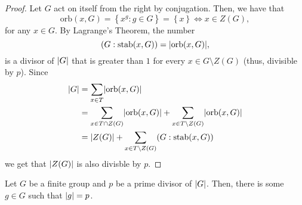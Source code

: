\begin{proof}
  Let \(G\) act on itself from the right by conjugation. Then, we have that
  \[
    \text{orb}(x,G)
    =
    \left\{x^{g}:g\in{G}\right\}
    =
    \left\{x\right\}
    \iff
    x\in{Z(G)},
  \]
  for any \(x\in{G}\). By Lagrange's Theorem, the number
  \[
    (G:\text{stab}(x,G))
    =
    \lvert\text{orb}(x,G)\rvert,
  \]
  is a divisor of \(\lvert G\rvert\) that is greater than \(1\) for every \({x}\in{G\setminus{Z(G)}}\) (thus, divisible by \(p\)). Since
  \begin{align*}
    \lvert G\rvert
    &=
    \sum_{x\in{T}}\lvert\text{orb}(x,G)\rvert
    \\
    &=
    \sum_{x\in{T\cap{Z(G)}}}\lvert\text{orb}(x,G)\rvert
    +
    \sum_{x\in{T\setminus{Z(G)}}}\lvert\text{orb}(x,G)\rvert
    \\
    &=
    \lvert Z(G)\rvert
    +
    \sum_{x\in{T\setminus{Z(G)}}}(G:\text{stab}(x,G))
  \end{align*}
  we get that \(\lvert Z(G)\rvert\) is also divisble by \(p\).
\end{proof}

\begin{theorem}[Cauchy]\label{thm:cauchys-theorem}
  Let \(G\) be a finite group and \(p\) be a prime divisor of \(\lvert G\rvert\). Then, there is some \(g\in{G}\) such that \(\lvert g\rvert=p\).
\end{theorem}

